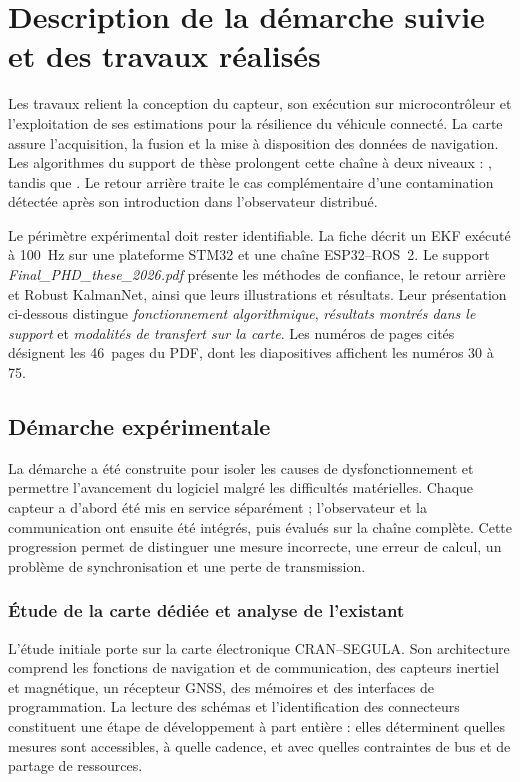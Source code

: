 \section{Description de la démarche suivie et des travaux réalisés}
\label{sec:travaux}

Les travaux relient la conception du capteur, son exécution sur microcontrôleur et l'exploitation de ses estimations pour la résilience du véhicule connecté. La carte assure l'acquisition, la fusion et la mise à disposition des données de navigation. Les algorithmes du support de thèse prolongent cette chaîne à deux niveaux : , tandis que . Le retour arrière traite le cas complémentaire d'une contamination détectée après son introduction dans l'observateur distribué.

Le périmètre expérimental doit rester identifiable. La fiche décrit un EKF exécuté à 100~Hz sur une plateforme STM32 et une chaîne ESP32--ROS~2. Le support \emph{Final\_PHD\_these\_2026.pdf} présente les méthodes de confiance, le retour arrière et Robust KalmanNet, ainsi que leurs illustrations et résultats. Leur présentation ci-dessous distingue \emph{fonctionnement algorithmique}, \emph{résultats montrés dans le support} et \emph{modalités de transfert sur la carte}. Les numéros de pages cités désignent les 46~pages du PDF, dont les diapositives affichent les numéros 30 à 75.

\subsection{Démarche expérimentale}

La démarche a été construite pour isoler les causes de dysfonctionnement et permettre l'avancement du logiciel malgré les difficultés matérielles. Chaque capteur a d'abord été mis en service séparément ; l'observateur et la communication ont ensuite été intégrés, puis évalués sur la chaîne complète. Cette progression permet de distinguer une mesure incorrecte, une erreur de calcul, un problème de synchronisation et une perte de transmission.

\subsubsection{Étude de la carte dédiée et analyse de l'existant}

L'étude initiale porte sur la carte électronique CRAN--SEGULA. Son architecture comprend les fonctions de navigation et de communication, des capteurs inertiel et magnétique, un récepteur GNSS, des mémoires et des interfaces de programmation. La lecture des schémas et l'identification des connecteurs constituent une étape de développement à part entière : elles déterminent quelles mesures sont accessibles, à quelle cadence, et avec quelles contraintes de bus et de partage de ressources.

